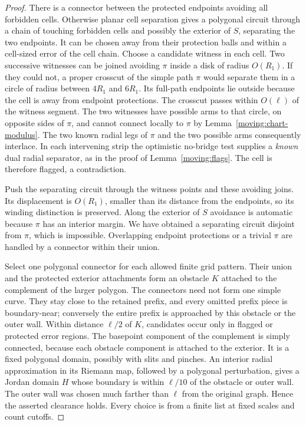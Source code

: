 \begin{proof}
There is a connector between the protected endpoints avoiding all
forbidden cells.  Otherwise planar cell separation gives a polygonal
circuit through a chain of touching forbidden cells and possibly the
exterior of $S$, separating the two endpoints.  It can be chosen
away from their protection balls and within a cell-sized error of
the cell chain.  Choose a candidate witness in each cell.  Two
successive witnesses can be joined avoiding $\pi$ inside a disk of
radius $O(R_1)$.  If they could not, a proper crosscut of the simple
path $\pi$ would separate them in a circle of radius between
$4R_1$ and $6R_1$.  Its full-path endpoints lie outside because the
cell is away from endpoint protections.  The crosscut passes within
$O(\ell)$ of the witness segment.  The two witnesses have possible
arms to that circle, on opposite sides of $\pi$, and cannot connect
locally to $\pi$ by Lemma~\ref{moving:chart-modulus}.  The two known
radial legs of $\pi$ and the two possible arms consequently interlace.
In each intervening strip the optimistic no-bridge test supplies a
\emph{known} dual radial separator, as in the proof of
Lemma~\ref{moving:flags}.  The cell is therefore flagged, a
contradiction.

Push the separating circuit through the witness points and these
avoiding joins.  Its displacement is $O(R_1)$, smaller than its
distance from the endpoints, so its winding distinction is preserved.
Along the exterior of $S$ avoidance is automatic because $\pi$ has
an interior margin.  We have obtained a separating circuit disjoint
from $\pi$, which is impossible.  Overlapping endpoint protections
or a trivial $\pi$ are handled by a connector within their union.

Select one polygonal connector for each allowed finite grid pattern.
Their union and the protected exterior attachments form an obstacle
$K$ attached to the complement of the larger polygon.  The connectors
need not form one simple curve.  They stay close to the retained
prefix, and every omitted prefix piece is boundary-near; conversely
the entire prefix is approached by this obstacle or the outer wall.
Within distance $\ell/2$ of $K$, candidates occur only in flagged or
protected error regions.  The basepoint component of the complement
is simply connected, because each obstacle component is attached to
the exterior.  It is a fixed polygonal domain, possibly with slits
and pinches.  An interior radial approximation in its Riemann map,
followed by a polygonal perturbation, gives a Jordan domain $H$ whose
boundary is within $\ell/10$ of the obstacle or outer wall.
The outer wall was chosen much farther than $\ell$ from the original
graph.  Hence the asserted clearance holds.  Every choice is from a
finite list at fixed scales and count cutoffs.


\end{proof}
